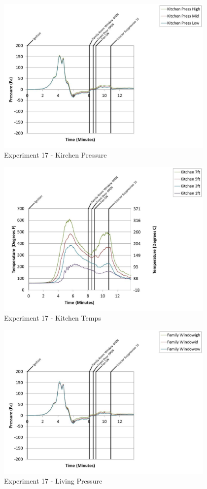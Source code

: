 \documentclass{article}
\begin{document}
\begin{appendices}
	\clearpage

	\begin{figure}[h!]
		\centering
		\includegraphics[height=3.05in]{0_Images/Results_Charts/Exp_17_Charts/KirchenPressure.pdf}
		\caption{Experiment 17 - Kirchen Pressure}
	\end{figure}
 

	\begin{figure}[h!]
		\centering
		\includegraphics[height=3.05in]{0_Images/Results_Charts/Exp_17_Charts/KitchenTemps.pdf}
		\caption{Experiment 17 - Kitchen Temps}
	\end{figure}
 
	\clearpage

	\begin{figure}[h!]
		\centering
		\includegraphics[height=3.05in]{0_Images/Results_Charts/Exp_17_Charts/LivingPressure.pdf}
		\caption{Experiment 17 - Living Pressure}
	\end{figure}
 


\end{appendices}
\end{document}
